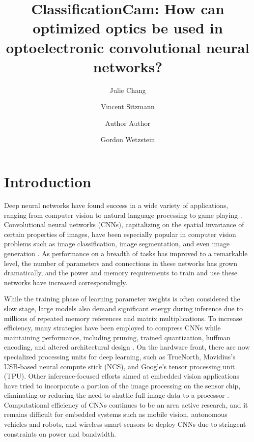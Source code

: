 \documentclass[fleqn,10pt]{wlscirep}
\title{ClassificationCam: How can optimized optics be used in optoelectronic convolutional neural networks?}
\author[1,*]{Julie Chang}
\author[2]{Vincent Sitzmann}
\author[3]{Author Author}
\author[2]{Gordon Wetzstein}
\affil[1]{Stanford University, Bioengineering Department, Stanford, 94305, USA}
\affil[2]{Stanford University, Electrical Engineering Department, Stanford, 94305, USA}
\affil[*]{corresponding.author@email.example}
\begin{document}
\flushbottom
\maketitle
%
%
\thispagestyle{empty}

\section*{Introduction}
\label{sec:intro}
Deep neural networks have found success in a wide variety of applications, ranging from computer vision to natural language processing to game playing \cite{lecun2015deep}. Convolutional neural networks (CNNs), capitalizing on the spatial invariance of certain properties of images, have been especially popular in computer vision problems such as image classification, image segmentation, and even image generation \cite{krizhevsky2012imagenet,goodfellow2014generative,long2015fully}. As performance on a breadth of tasks has improved to a remarkable level, the number of parameters and connections in these networks has grown dramatically, and the power and memory requirements to train and use these networks have increased correspondingly. 

While the training phase of learning parameter weights is often considered the slow stage, large models also demand significant energy during inference due to millions of repeated memory references and matrix multiplications. To increase efficiency, many strategies have been employed to compress CNNs while maintaining performance, including pruning, trained quantization, huffman encoding, and altered architectural design \cite{han2015deep,iandola2016squeezenet}. On the hardware front, there are now specialized processing units for deep learning, such as TrueNorth, Movidius's USB-based neural compute stick (NCS), and Google's tensor processing unit (TPU).  Other inference-focused efforts aimed at embedded vision applications have tried to incorporate a portion of the image processing on the sensor chip, eliminating or reducing the need to shuttle full image data to a processor \cite{gruev2002implementation,likamwa2016redeye}. Computational efficiency of CNNs continues to be an area active research, and it remains difficult for embedded systems such as mobile vision, autonomous vehicles and robots, and wireless smart sensors to deploy CNNs due to stringent constraints on power and bandwidth. 
\end{document}

